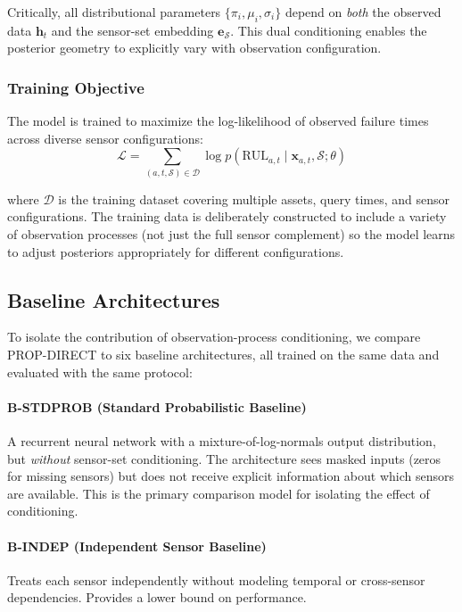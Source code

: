 Critically, all distributional parameters $\{\pi_i, \mu_i, \sigma_i\}$ depend on \emph{both} the observed data $\mathbf{h}_t$ and the sensor-set embedding $\mathbf{e}_{\mathcal{S}}$. This dual conditioning enables the posterior geometry to explicitly vary with observation configuration.

\subsubsection{Training Objective}

The model is trained to maximize the log-likelihood of observed failure times across diverse sensor configurations:
\[
\mathcal{L} = \sum_{(a,t,\mathcal{S}) \in \mathcal{D}} \log p(\text{RUL}_{a,t} \mid \mathbf{x}_{a,t}, \mathcal{S}; \theta)
\]

where $\mathcal{D}$ is the training dataset covering multiple assets, query times, and sensor configurations. The training data is deliberately constructed to include a variety of observation processes (not just the full sensor complement) so the model learns to adjust posteriors appropriately for different configurations.

\subsection{Baseline Architectures}
\label{sec:methods:baselines}

To isolate the contribution of observation-process conditioning, we compare PROP-DIRECT to six baseline architectures, all trained on the same data and evaluated with the same protocol:

\paragraph{B-STDPROB (Standard Probabilistic Baseline)}
A recurrent neural network with a mixture-of-log-normals output distribution, but \emph{without} sensor-set conditioning. The architecture sees masked inputs (zeros for missing sensors) but does not receive explicit information about which sensors are available. This is the primary comparison model for isolating the effect of conditioning.

\paragraph{B-INDEP (Independent Sensor Baseline)}
Treats each sensor independently without modeling temporal or cross-sensor dependencies. Provides a lower bound on performance.

